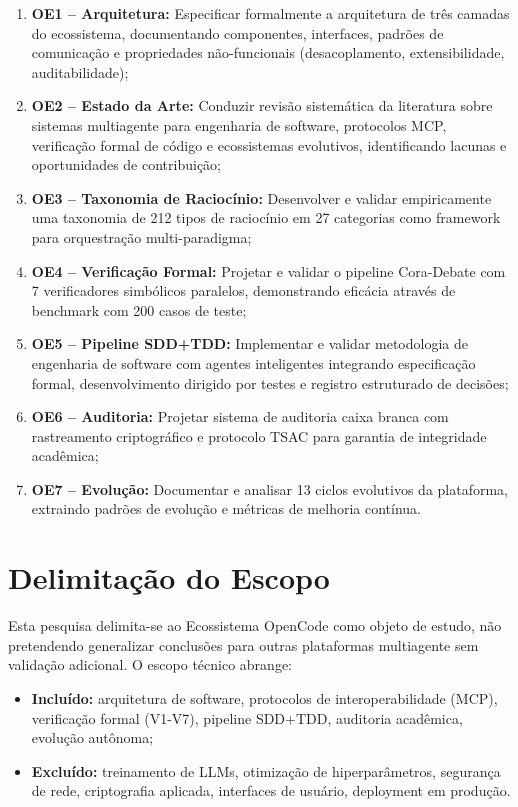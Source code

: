 \documentclass[12pt,a4paper,sumario=tradicional]{abntex2}
\begin{document}
\begin{enumerate}[leftmargin=*]
    \item \textbf{OE1 -- Arquitetura:} Especificar formalmente a arquitetura de três camadas do ecossistema, documentando componentes, interfaces, padrões de comunicação e propriedades não-funcionais (desacoplamento, extensibilidade, auditabilidade);
    \item \textbf{OE2 -- Estado da Arte:} Conduzir revisão sistemática da literatura sobre sistemas multiagente para engenharia de software, protocolos MCP, verificação formal de código e ecossistemas evolutivos, identificando lacunas e oportunidades de contribuição;
    \item \textbf{OE3 -- Taxonomia de Raciocínio:} Desenvolver e validar empiricamente uma taxonomia de 212 tipos de raciocínio em 27 categorias como framework para orquestração multi-paradigma;
    \item \textbf{OE4 -- Verificação Formal:} Projetar e validar o pipeline Cora-Debate com 7 verificadores simbólicos paralelos, demonstrando eficácia através de benchmark com 200 casos de teste;
    \item \textbf{OE5 -- Pipeline SDD+TDD:} Implementar e validar metodologia de engenharia de software com agentes inteligentes integrando especificação formal, desenvolvimento dirigido por testes e registro estruturado de decisões;
    \item \textbf{OE6 -- Auditoria:} Projetar sistema de auditoria caixa branca com rastreamento criptográfico e protocolo TSAC para garantia de integridade acadêmica;
    \item \textbf{OE7 -- Evolução:} Documentar e analisar 13 ciclos evolutivos da plataforma, extraindo padrões de evolução e métricas de melhoria contínua.
\end{enumerate}

\section{Delimitação do Escopo}

Esta pesquisa delimita-se ao Ecossistema OpenCode como objeto de estudo, não pretendendo generalizar conclusões para outras plataformas multiagente sem validação adicional. O escopo técnico abrange:

\begin{itemize}
    \item \textbf{Incluído:} arquitetura de software, protocolos de interoperabilidade (MCP), verificação formal (V1-V7), pipeline SDD+TDD, auditoria acadêmica, evolução autônoma;
    \item \textbf{Excluído:} treinamento de LLMs, otimização de hiperparâmetros, segurança de rede, criptografia aplicada, interfaces de usuário, deployment em produção.
\end{itemize}
\end{document}
